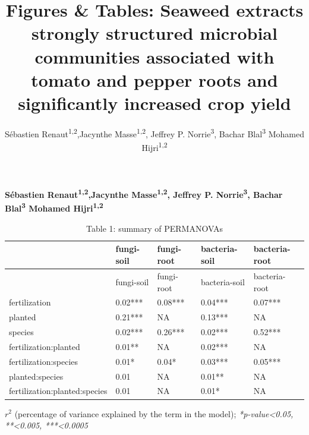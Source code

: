 \documentclass[11pt,]{article}
\title{Figures \& Tables: Seaweed extracts strongly structured microbial
communities associated with tomato and pepper roots and significantly
increased crop yield  }
\author{\Large Sébastien Renaut\textsuperscript{1,2},Jacynthe
Masse\textsuperscript{1,2}, Jeffrey P. Norrie\textsuperscript{3}, Bachar
Blal\textsuperscript{3} Mohamed Hijri\textsuperscript{1,2}\vspace{0.05in} \newline\normalsize\emph{}  }
\date{}
\newcommand*{\authorfont}{\fontfamily{phv}\selectfont}
\begin{document}
	
%

{%
\setlength{\parindent}{0pt}
\thispagestyle{plain}
{\fontsize{18}{20}\selectfont\raggedright 
\maketitle  %

}

{
   \vskip 13.5pt\relax \normalsize\fontsize{11}{12} 
\textbf{\authorfont Sébastien Renaut\textsuperscript{1,2},Jacynthe
Masse\textsuperscript{1,2}, Jeffrey P. Norrie\textsuperscript{3}, Bachar
Blal\textsuperscript{3} Mohamed Hijri\textsuperscript{1,2}} \hskip 15pt \emph{\small }   

}

}






\vskip 6.5pt


\noindent \doublespacing \newpage 

\begin{longtable}[]{@{}lllll@{}}
\caption{Table 1: summary of PERMANOVAs}\tabularnewline
\toprule
& fungi-soil & fungi-root & bacteria-soil & bacteria-root\tabularnewline
\midrule
\endfirsthead
\toprule
& fungi-soil & fungi-root & bacteria-soil & bacteria-root\tabularnewline
\midrule
\endhead
fertilization & 0.02*** & 0.08*** & 0.04*** & 0.07***\tabularnewline
planted & 0.21*** & NA & 0.13*** & NA\tabularnewline
species & 0.02*** & 0.26*** & 0.02*** & 0.52***\tabularnewline
fertilization:planted & 0.01** & NA & 0.02*** & NA\tabularnewline
fertilization:species & 0.01* & 0.04* & 0.03*** & 0.05***\tabularnewline
planted:species & 0.01 & NA & 0.01** & NA\tabularnewline
fertilization:planted:species & 0.01 & NA & 0.01* & NA\tabularnewline
\bottomrule
\end{longtable}

\(r^2\) (percentage of variance explained by the term in the model);
\emph{*p-value\textless{}0.05, **\textless{}0.005, ***\textless{}0.0005}

\newpage 
\end{document}
